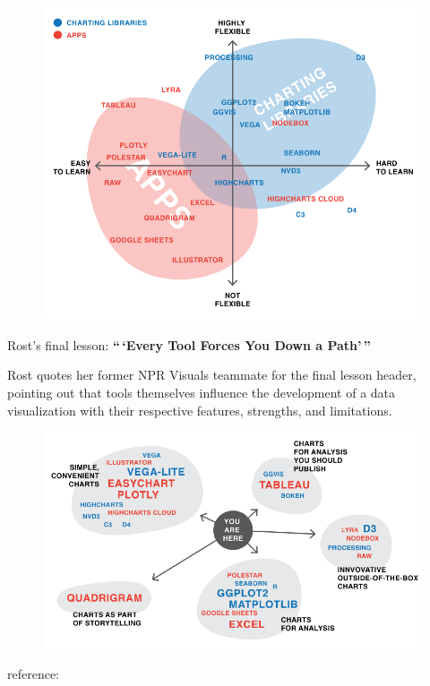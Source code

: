 \documentclass[]{book}
\theoremstyle{definition}
\theoremstyle{definition}
\theoremstyle{definition}
\theoremstyle{remark}
\begin{document}
\begin{figure}
\centering
\includegraphics{images/apps_vs_code.png}
\caption{}
\end{figure}

Rost's final lesson: \textbf{``\,`Every Tool Forces You Down a
Path'\,''}

Rost quotes her former NPR Visuals teammate for the final lesson header,
pointing out that tools themselves influence the development of a data
visualization with their respective features, strengths, and
limitations.

\begin{figure}
\centering
\includegraphics{images/tools_force_paths.png}
\caption{}
\end{figure}

reference: \citep{different_tools}
\end{document}

